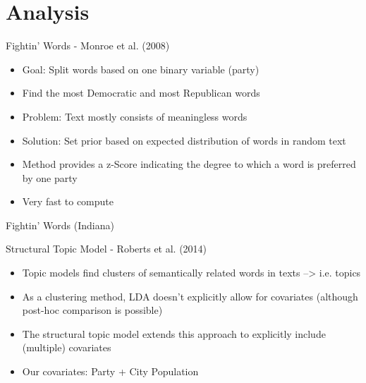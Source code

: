 \documentclass[12pt]{beamer}
\begin{document}
\section{Analysis}


\begin{frame}{Fightin' Words - Monroe et al. (2008)}
\linespread{1.5}
\begin{itemize}
	\item Goal: Split words based on one binary variable (party)
	\item Find the most Democratic and most Republican words
	\item Problem: Text mostly consists of meaningless words
	\item Solution: Set prior based on expected distribution of words in random text
	\item Method provides a z-Score indicating the degree to which a word is preferred by one party
	\item Very fast to compute
\end{itemize}
\end{frame}

\begin{frame}{Fightin' Words (Indiana)}
	
%	
\end{frame}

%

\begin{frame}{Structural Topic Model - Roberts et al. (2014)}
\linespread{1.5}
\begin{itemize}
	\item Topic models find clusters of semantically related words in texts --> i.e. topics
	\item As a clustering method, LDA doesn't explicitly allow for covariates (although post-hoc comparison is possible)
	\item The structural topic model extends this approach to explicitly include (multiple) covariates
	\item Our covariates: Party + City Population
\end{itemize}
\end{frame}
\end{document}
